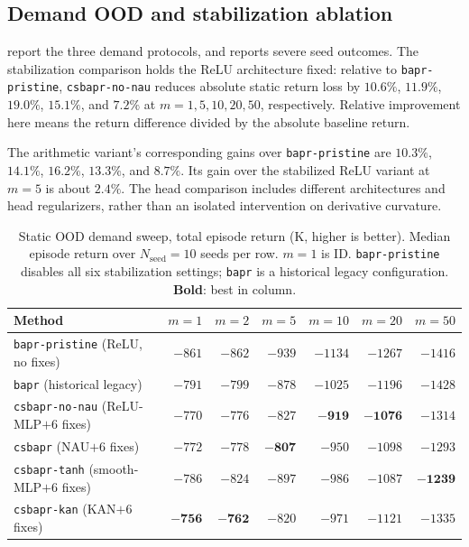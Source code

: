 \documentclass[10pt]{article}
\begin{document}
\subsection{Demand OOD and stabilization ablation}
\label{sec:ood_results}

 report the three demand protocols, and  reports severe seed outcomes. The stabilization comparison holds the ReLU architecture fixed: relative to \texttt{bapr-pristine}, \texttt{csbapr-no-nau} reduces absolute static return loss by $10.6\%$, $11.9\%$, $19.0\%$, $15.1\%$, and $7.2\%$ at $m=1,5,10,20,50$, respectively. Relative improvement here means the return difference divided by the absolute baseline return.

The arithmetic variant's corresponding gains over \texttt{bapr-pristine} are $10.3\%$, $14.1\%$, $16.2\%$, $13.3\%$, and $8.7\%$. Its gain over the stabilized ReLU variant at $m=5$ is about $2.4\%$. The head comparison includes different architectures and head regularizers, rather than an isolated intervention on derivative curvature.


\begin{table}[htbp]
\centering
\scriptsize
\caption{Static OOD demand sweep, total episode return (K, higher is better). Median episode return over $N_{\mathrm{seed}}{=}10$ seeds per row. $m=1$ is ID. \texttt{bapr-pristine} disables all six stabilization settings; \texttt{bapr} is a historical legacy configuration. \textbf{Bold}: best in column.}
\label{tab:ood_sweep}
\begin{tabular}{lrrrrrr}
\toprule
Method & $m{=}1$ & $m{=}2$ & $m{=}5$ & $m{=}10$ & $m{=}20$ & $m{=}50$ \\
\midrule
\texttt{bapr-pristine} (ReLU, no fixes)         & $-861$ & $-862$ & $-939$ & $-1134$ & $-1267$ & $-1416$ \\
\texttt{bapr} (historical legacy)            & $-791$ & $-799$ & $-878$ & $-1025$ & $-1196$ & $-1428$ \\
\texttt{csbapr-no-nau} (ReLU-MLP$+$6 fixes)     & $-770$ & $-776$ & $-827$ & $\mathbf{-919}$ & $\mathbf{-1076}$ & $-1314$ \\
\texttt{csbapr} (NAU$+$6 fixes)                 & $-772$ & $-778$ & $\mathbf{-807}$ & $-950$ & $-1098$ & $-1293$ \\
\texttt{csbapr-tanh} (smooth-MLP$+$6 fixes)     & $-786$ & $-824$ & $-897$ & $-986$ & $-1087$ & $\mathbf{-1239}$ \\
\texttt{csbapr-kan} (KAN$+$6 fixes)             & $\mathbf{-756}$ & $\mathbf{-762}$ & $-820$ & $-971$ & $-1121$ & $-1335$ \\
\bottomrule
\end{tabular}
\end{table}
\end{document}
